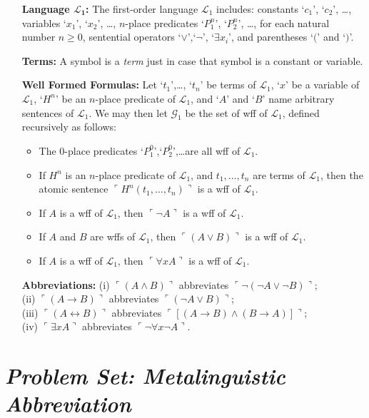 \documentclass[a4paper, 11pt]{article} %
\newcommand{\corner}[1]{\ulcorner#1\urcorner} %
\begin{document}
\begin{enumerate}[leftmargin=1.2in,labelsep=.15in] %
\item[\bf Language $\boldsymbol{\mathcal{L}_1}$:] The first-order language $\mathcal{L}_1$ includes: constants `$c_1$', `$c_2$', \dots, variables `$x_1$', `$x_2$', \dots, $n$-place predicates `$P_1^n$', `$P_2^n$', \dots, for each natural number $n\geq0$, sentential operators `$\vee$',`$\neg$', `$\exists x_i$', and parentheses `$($' and `$)$'.
\item[\bf Terms:] A symbol is a \textit{term} just in case that symbol is a constant or variable.
\item[\bf Well Formed Formulas:] Let `$t_1$',\dots, `$t_n$' be terms of $\mathcal{L}_1$, `$x$' be a variable of $\mathcal{L}_1$, `$H^n$' be an $n$-place predicate of $\mathcal{L}_1$, and `$A$' and `$B$' name arbitrary sentences of $\mathcal{L}_1$. We may then let $\mathcal{G}_1$ be the set of wff of $\mathcal{L}_1$, defined recursively as follows:
\begin{itemize}
\item The 0-place predicates `$P_1^0$',`$P_2^0$',\dots are all wff of $\mathcal{L}_1$.
\item If ${H^n}$ is an $n$-place predicate of $\mathcal{L}_1$, and ${t_1},\dots,{t_n}$ are terms of $\mathcal{L}_1$, then the atomic sentence $\corner{H^n(t_1,\dots,t_n)}$ is a wff of $\mathcal{L}_1$.
\item If ${A}$ is a wff of $\mathcal{L}_1$, then $\corner{\neg A}$ is a wff of $\mathcal{L}_1$.
\item If ${A}$ and ${B}$ are wffs of $\mathcal{L}_1$, then $\corner{(A\vee B)}$ is a wff of $\mathcal{L}_1$.
\item If ${A}$ is a wff of $\mathcal{L}_1$, then $\corner{\forall xA}$ is a wff of $\mathcal{L}_1$.
\end{itemize}
\item[\bf Abbreviations:] (i) $\corner{(A\wedge B)}$ abbreviates $\corner{\neg(\neg A\vee\neg B)}$;\\ (ii) $\corner{(A\rightarrow B)}$ abbreviates $\corner{(\neg A\vee B)}$;\\ (iii) $\corner{(A\leftrightarrow B)}$ abbreviates $\corner{[(A\rightarrow B)\wedge(B\rightarrow A)]}$;\\ (iv) $\corner{\exists xA}$ abbreviates $\corner{\neg\forall x\neg A}$.
\end{enumerate}



\section*{\it Problem Set: Metalinguistic Abbreviation}
\end{document}
